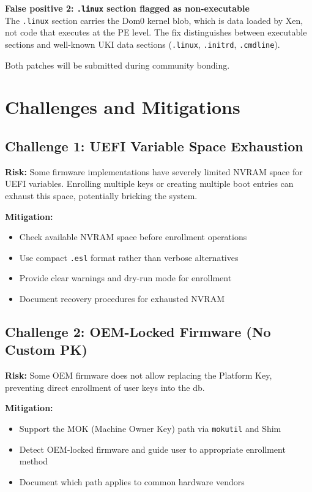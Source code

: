 \documentclass[12pt, a4paper]{article}
\begin{document}
\textbf{False positive 2: \texttt{.linux} section flagged as non-executable}\\
The \texttt{.linux} section carries the Dom0 kernel blob, which is data loaded by Xen, not code that executes at the PE level. The fix distinguishes between executable sections and well-known UKI data sections (\texttt{.linux}, \texttt{.initrd}, \texttt{.cmdline}).

Both patches will be submitted during community bonding.

\section{Challenges and Mitigations}

\subsection*{Challenge 1: UEFI Variable Space Exhaustion}

\textbf{Risk:} Some firmware implementations have severely limited NVRAM space for UEFI variables. Enrolling multiple keys or creating multiple boot entries can exhaust this space, potentially bricking the system.

\textbf{Mitigation:}
\begin{itemize}
    \item Check available NVRAM space before enrollment operations
    \item Use compact \texttt{.esl} format rather than verbose alternatives
    \item Provide clear warnings and dry-run mode for enrollment
    \item Document recovery procedures for exhausted NVRAM
\end{itemize}

\subsection*{Challenge 2: OEM-Locked Firmware (No Custom PK)}

\textbf{Risk:} Some OEM firmware does not allow replacing the Platform Key, preventing direct enrollment of user keys into the db.

\textbf{Mitigation:}
\begin{itemize}
    \item Support the MOK (Machine Owner Key) path via \texttt{mokutil} and Shim
    \item Detect OEM-locked firmware and guide user to appropriate enrollment method
    \item Document which path applies to common hardware vendors
\end{itemize}
\end{document}
